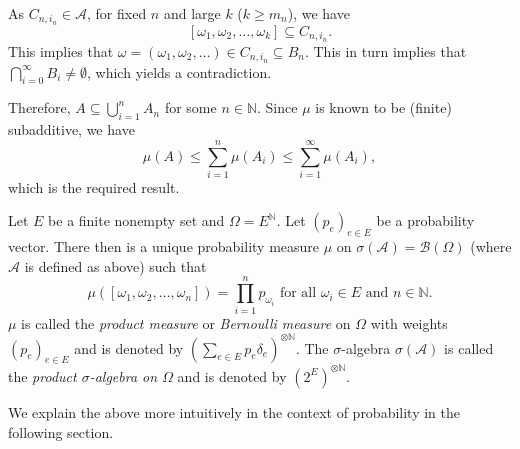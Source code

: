 As $C_{n,i_n}\in\mathcal{A}$, for fixed $n$ and large $k$ ($k\geq m_n$), we have $$[\omega_1,\omega_2,\ldots,\omega_k]\subseteq C_{n,i_n}.$$
This implies that $\omega=(\omega_1,\omega_2,\ldots)\in C_{n,i_n}\subseteq B_n$. This in turn implies that $\bigcap_{i=0}^\infty B_i\neq\emptyset$, which yields a contradiction.

Therefore, $A\subseteq\bigcup_{i=1}^n A_n$ for some $n\in\mathbb{N}$. Since $\mu$ is known to be (finite) subadditive, we have
$$\mu(A)\leq \sum_{i=1}^n\mu(A_i)\leq \sum_{i=1}^\infty \mu(A_i),$$
which is the required result.

\begin{definition}
\label{defProductMeasure}
    Let $E$ be a finite nonempty set and $\Omega=E^\mathbb{N}$. Let $(p_e)_{e\in E}$ be a probability vector. There then is a unique probability measure $\mu$ on $\sigma(\mathcal{A})=\mathcal{B}(\Omega)$ (where $\mathcal{A}$ is defined as above) such that
    $$\mu([\omega_1,\omega_2,\ldots,\omega_n])=\prod_{i=1}^n p_{\omega_i}\text{ for all $\omega_i\in E$ and $n\in\mathbb{N}$}.$$
    $\mu$ is called the \textit{product measure} or \textit{Bernoulli measure} on $\Omega$ with weights $(p_e)_{e\in E}$ and is denoted by $\left(\sum_{e\in E}p_e\delta_e\right)^{\otimes\mathbb{N}}$. The $\sigma$-algebra $\sigma(\mathcal{A})$ is called the \textit{product $\sigma$-algebra on $\Omega$} and is denoted by $(2^E)^{\otimes\mathbb{N}}$.
\end{definition}

We explain the above more intuitively in the context of probability in the following section.
\clearpage